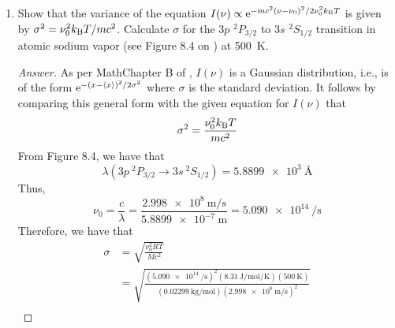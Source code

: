 \documentclass[../psets.tex]{subfiles}
\begin{document}
\begin{enumerate}[label={\textbf{27-\arabic*.}},leftmargin=3.5em]
\begin{proof}[Answer]
        Naturally, the above equals $\erf(w_0)$ by the definition of the error function.\par
        Lastly, if $u_{x0}=\sqrt{2\kB T/m}$, then
        \begin{equation*}
            w_0 = u_{x0}\sqrt{m/2\kB T}
            = \sqrt{2\kB T/m}\cdot\sqrt{m/2\kB T}
            = 1
        \end{equation*}
        It follows that
        \begin{align*}
            \Prob\{-\sqrt{2\kB T/m}\leq u_x\leq\sqrt{2\kB T/m}\} &= \erf(w_0)\\
            &= \erf(1)\\
            \Aboxed{\Prob\{-\sqrt{2\kB T/m}\leq u_x\leq\sqrt{2\kB T/m}\} &= 0.84270}
        \end{align*}
    \end{proof}
    \setcounter{enumi}{19}
    \item Show that the variance of the equation $I(\nu)\propto\e[-mc^2(\nu-\nu_0)^2/2\nu_0^2\kB T]$ is given by $\sigma^2=\nu_0^2\kB T/mc^2$. Calculate $\sigma$ for the $3p$ ${}^2P_{3/2}$ to $3s$ ${}^2S_{1/2}$ transition in atomic sodium vapor (see Figure 8.4 on \textcite[307]{bib:McQuarrieSimon}) at \SI{500}{\kelvin}.
    \begin{proof}[Answer]
        As per MathChapter B of \textcite{bib:McQuarrieSimon}, $I(\nu)$ is a Gaussian distribution, i.e., is of the form $\e[-(x-\prb{x})^2/2\sigma^2]$ where $\sigma$ is the standard deviation. It follows by comparing this general form with the given equation for $I(\nu)$ that
        \begin{equation*}
            \sigma^2 = \frac{\nu_0^2\kB T}{mc^2}
        \end{equation*}
        From Figure 8.4, we have that
        \begin{equation*}
            \lambda(3p\ {}^2P_{3/2}\to 3s\ {}^2S_{1/2}) = \SI{5.8899e3}{\angstrom}
        \end{equation*}
        Thus,
        \begin{equation*}
            \nu_0 = \frac{c}{\lambda}
            = \frac{\SI{2.998e8}{\meter\per\second}}{\SI{5.8899e-7}{\meter}}
            = \SI{5.090e14}{\per\second}
        \end{equation*}
        Therefore, we have that
        \begin{align*}
            \sigma &= \sqrt{\frac{\nu_0^2RT}{Mc^2}}\\
            &= \sqrt{\frac{(\SI[per-mode=fraction]{5.090e14}{\per\second})^2(\SI[per-mode=fraction]{8.31}{\joule\per\mole\per\kelvin})(\SI{500}{\kelvin})}{(\SI[per-mode=fraction]{0.02299}{\kilo\gram\per\mole})(\SI[per-mode=fraction]{2.998e8}{\meter\per\second})^2}}\\

\end{align*}
\end{proof}
\end{enumerate}
\end{document}
